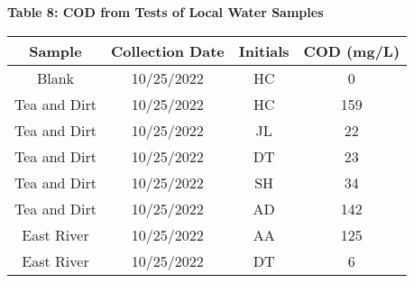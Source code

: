 \newpage
\begin{center}
{\large {\bf Table 8: COD from Tests of Local Water Samples\\}}
\vspace{2mm}
\begin{tabular}{|cccc|} 
    \hline
    \textbf{Sample}       & \textbf{Collection Date} & \textbf{Initials} & \textbf{COD (mg/L)}  \\ 
    \hline
    Blank        & 10/25/2022      & HC       & 0    \\
    Tea and Dirt & 10/25/2022      & HC       & 159  \\
    Tea and Dirt & 10/25/2022      & JL       & 22   \\
    Tea and Dirt & 10/25/2022      & DT       & 23   \\
    Tea and Dirt & 10/25/2022      & SH       & 34   \\
    Tea and Dirt & 10/25/2022      & AD       & 142  \\
    East River   & 10/25/2022      & AA       & 125  \\
    East River   & 10/25/2022      & DT       & 6    \\
    \hline
\end{tabular}
\end{center}
\newpage